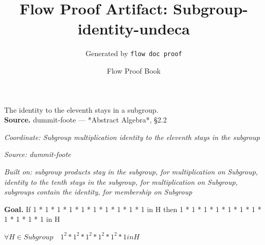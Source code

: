 \documentclass[11pt]{article}
\title{Flow Proof Artifact: Subgroup-identity-undeca}
\author{Generated by \texttt{flow doc proof}}
\date{Flow Proof Book}
\theoremstyle{definition}
\begin{document}
\maketitle
The identity to the eleventh stays in a subgroup.\\[0.5em]
\textbf{Source.} dummit-foote — *Abstract Algebra*, §2.2\\[0.5em]
\bigskip
{}\par
\smallskip\noindent\textit{Coordinate: Subgroup \cdot multiplication \cdot identity to the eleventh stays in the subgroup}\par
\smallskip\noindent\textit{Source: dummit-foote}\par
\smallskip\noindent\textit{Built on: subgroup products stay in the subgroup, for multiplication on Subgroup, identity to the tenth stays in the subgroup, for multiplication on Subgroup, subgroups contain the identity, for membership on Subgroup}\par
\medskip
\noindent\textbf{Goal.} If 1 * 1 * 1 * 1 * 1 * 1 * 1 * 1 * 1 * 1 in H then 1 * 1 * 1 * 1 * 1 * 1 * 1 * 1 * 1 * 1 * 1 in H\par
\noindent$\displaystyle \forall H \in Subgroup\quad 1^{2} * 1^{2} * 1^{2} * 1^{2} * 1^{2} * 1 in H$\par
\medskip
\noindent
\end{document}
